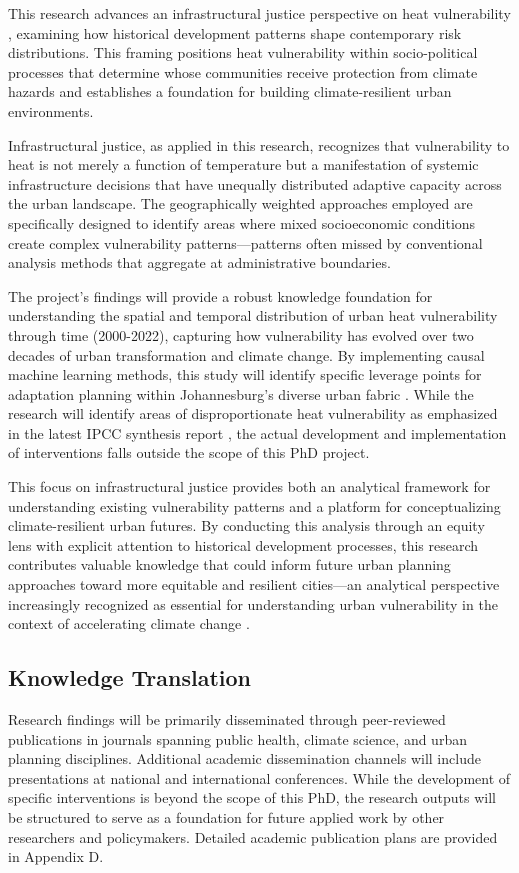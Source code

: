This research advances an infrastructural justice perspective on heat vulnerability \citep{Romanello2023}, examining how historical development patterns shape contemporary risk distributions. This framing positions heat vulnerability within socio-political processes that determine whose communities receive protection from climate hazards \citep{IPCC2024} and establishes a foundation for building climate-resilient urban environments.

Infrastructural justice, as applied in this research, recognizes that vulnerability to heat is not merely a function of temperature but a manifestation of systemic infrastructure decisions that have unequally distributed adaptive capacity across the urban landscape. The geographically weighted approaches employed are specifically designed to identify areas where mixed socioeconomic conditions create complex vulnerability patterns—patterns often missed by conventional analysis methods that aggregate at administrative boundaries.

The project's findings will provide a robust knowledge foundation for understanding the spatial and temporal distribution of urban heat vulnerability through time (2000-2022), capturing how vulnerability has evolved over two decades of urban transformation and climate change. By implementing causal machine learning methods, this study will identify specific leverage points for adaptation planning within Johannesburg's diverse urban fabric \citep{Velasquez2023}. While the research will identify areas of disproportionate heat vulnerability as emphasized in the latest IPCC synthesis report \citep{IPCC2024}, the actual development and implementation of interventions falls outside the scope of this PhD project.

This focus on infrastructural justice provides both an analytical framework for understanding existing vulnerability patterns and a platform for conceptualizing climate-resilient urban futures. By conducting this analysis through an equity lens with explicit attention to historical development processes, this research contributes valuable knowledge that could inform future urban planning approaches toward more equitable and resilient cities—an analytical perspective increasingly recognized as essential for understanding urban vulnerability in the context of accelerating climate change \citep{Praharaj2024}.

\subsection{Knowledge Translation}
Research findings will be primarily disseminated through peer-reviewed publications in journals spanning public health, climate science, and urban planning disciplines. Additional academic dissemination channels will include presentations at national and international conferences. While the development of specific interventions is beyond the scope of this PhD, the research outputs will be structured to serve as a foundation for future applied work by other researchers and policymakers. Detailed academic publication plans are provided in Appendix D.